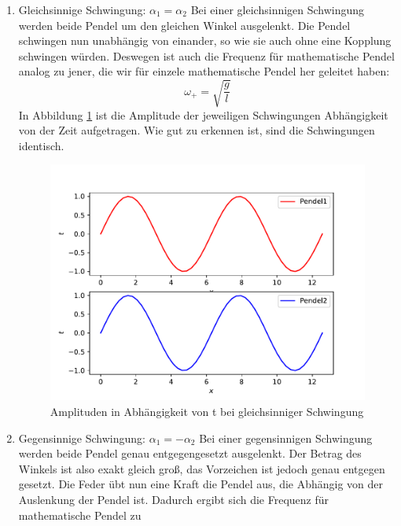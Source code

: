 \begin{enumerate}
    \item Gleichsinnige Schwingung: $\alpha_1=\alpha_2$
        Bei einer gleichsinnigen Schwingung werden beide Pendel um den gleichen Winkel ausgelenkt. Die Pendel schwingen nun unabhängig von einander, 
        so wie sie auch ohne eine Kopplung schwingen würden. Deswegen ist auch die Frequenz für mathematische Pendel analog zu jener, die wir für einzele 
        mathematische Pendel her geleitet haben:
        \begin{equation}
            \omega_{+}=\sqrt{\frac{g}{l}}
        \end{equation}
        In Abbildung \ref{fig:gleichsinnig} ist die Amplitude der jeweiligen Schwingungen Abhängigkeit von der Zeit aufgetragen. Wie gut zu erkennen ist, sind
        die Schwingungen identisch.
        \begin{figure}
        \centering
        \includegraphics[scale = 0.5]{gleichsinnig.pdf}
        \caption{Amplituden in Abhängigkeit von t bei gleichsinniger Schwingung}
        \label{fig:gleichsinnig}
      \end{figure}
    \item Gegensinnige Schwingung: $\alpha_1=-\alpha_2$
        Bei einer gegensinnigen Schwingung werden beide Pendel genau entgegengesetzt ausgelenkt. Der Betrag des Winkels ist also exakt gleich groß, das Vorzeichen
        ist jedoch genau entgegen gesetzt. Die Feder übt nun eine Kraft die Pendel aus, die Abhängig von der Auslenkung der Pendel ist. Dadurch ergibt sich die 
        Frequenz für mathematische Pendel zu
        \begin{equation}

\end{equation}
\end{enumerate}
